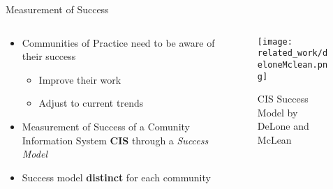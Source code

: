 \begin{frame}{Measurement of Success}
  \begin{columns}
    \begin{column}[]{0.3\textwidth}
      \begin{itemize}
        \item Communities of Practice need to be aware of their success
              \begin{itemize}
                \item Improve their work
                \item Adjust to current trends
              \end{itemize}
              \item Measurement of Success of a Comunity Information System \textbf{CIS} through a \emph{Success Model}
              \item Success model \textbf{distinct} for each community
      \end{itemize}
    \end{column}
    \begin{column}[]{0.7\textwidth}
      \begin{figure}
        \centering
        \texttt{[image: related\_work/deloneMclean.png]}
        \caption{CIS Success Model by DeLone and McLean \cite{DeMc92}}
      \end{figure}
    \end{column}
  \end{columns}
\end{frame}



